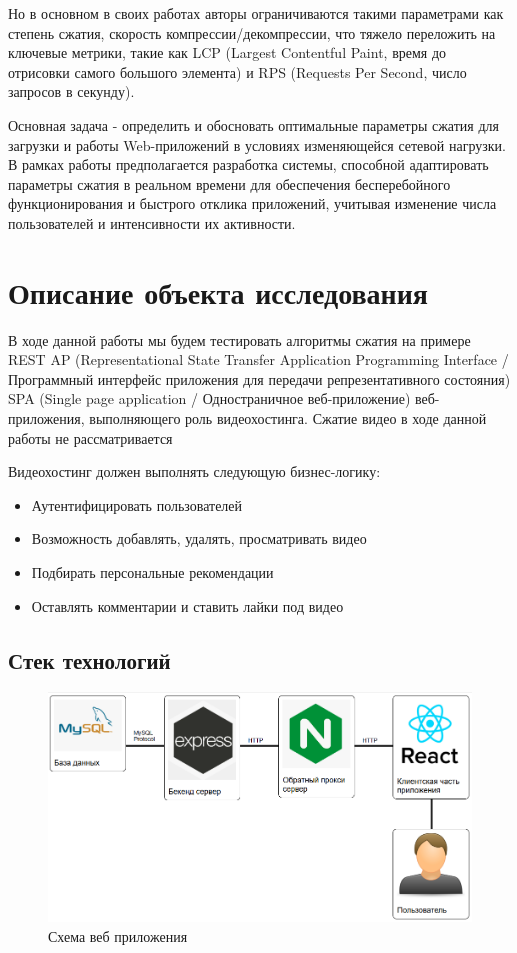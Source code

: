 \documentclass[12pt]{article}
\begin{document}
Но в основном в своих работах авторы ограничиваются такими параметрами как степень сжатия, скорость компрессии/декомпрессии,
что тяжело переложить на ключевые метрики, такие как LCP (Largest Contentful Paint, время до отрисовки самого большого элемента) и RPS (Requests Per Second, число запросов в секунду).

Основная задача - определить и обосновать оптимальные параметры сжатия для загрузки и работы Web-приложений в условиях изменяющейся сетевой нагрузки.
В рамках работы предполагается разработка системы, способной адаптировать параметры сжатия в реальном времени для обеспечения бесперебойного
функционирования и быстрого отклика приложений, учитывая изменение числа пользователей и интенсивности их активности.

\section{Описание объекта исследования}

В ходе данной работы мы будем тестировать алгоритмы сжатия на примере REST AP
(Representational State Transfer Application Programming Interface / Программный интерфейс приложения для передачи репрезентативного состояния)
SPA (Single page application / Одностраничное веб-приложение) веб-приложения, выполняющего роль видеохостинга.
Сжатие видео в ходе данной работы не рассматривается

Видеохостинг должен выполнять следующую бизнес-логику:

\begin{itemize}
    \item Аутентифицировать пользователей
    \item Возможность добавлять, удалять, просматривать видео
    \item Подбирать персональные рекомендации
    \item Оставлять комментарии и ставить лайки под видео
\end{itemize}

\subsection{Стек технологий}

\begin{figure}[H]
    \centering
    \includegraphics[width=1\textwidth]{../images/Схема_веб-приложения.png}
    \caption{Схема веб приложения}
\end{figure}
\end{document}
